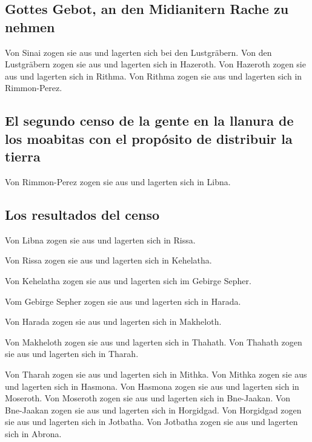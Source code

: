 \hypertarget{gottes-gebot-an-den-midianitern-rache-zu-nehmen}{%
\subsection{Gottes Gebot, an den Midianitern Rache zu
nehmen}\label{gottes-gebot-an-den-midianitern-rache-zu-nehmen}}

 Von Sinai zogen sie aus und lagerten sich bei den
Lustgräbern.  Von den Lustgräbern zogen sie aus und
lagerten sich in Hazeroth.  Von Hazeroth zogen sie aus
und lagerten sich in Rithma.  Von Rithma zogen sie aus
und lagerten sich in Rimmon-Perez.

\hypertarget{el-segundo-censo-de-la-gente-en-la-llanura-de-los-moabitas-con-el-propuxf3sito-de-distribuir-la-tierra}{%
\subsection{El segundo censo de la gente en la llanura de los moabitas
con el propósito de distribuir la
tierra}\label{el-segundo-censo-de-la-gente-en-la-llanura-de-los-moabitas-con-el-propuxf3sito-de-distribuir-la-tierra}}

 Von Rimmon-Perez zogen sie aus und lagerten sich in
Libna.

\hypertarget{los-resultados-del-censo-1}{%
\subsection{Los resultados del censo}\label{los-resultados-del-censo-1}}

 Von Libna zogen sie aus und lagerten sich in Rissa.

 Von Rissa zogen sie aus und lagerten sich in Kehelatha.

 Von Kehelatha zogen sie aus und lagerten sich im Gebirge
Sepher.

 Vom Gebirge Sepher zogen sie aus und lagerten sich in
Harada.

 Von Harada zogen sie aus und lagerten sich in Makheloth.

 Von Makheloth zogen sie aus und lagerten sich in
Thahath.  Von Thahath zogen sie aus und lagerten sich in
Tharah.

 Von Tharah zogen sie aus und lagerten sich in Mithka.
 Von Mithka zogen sie aus und lagerten sich in Hasmona.
 Von Hasmona zogen sie aus und lagerten sich in Moseroth.
 Von Moseroth zogen sie aus und lagerten sich in
Bne-Jaakan.  Von Bne-Jaakan zogen sie aus und lagerten
sich in Horgidgad.  Von Horgidgad zogen sie aus und
lagerten sich in Jotbatha.  Von Jotbatha zogen sie aus
und lagerten sich in Abrona.

